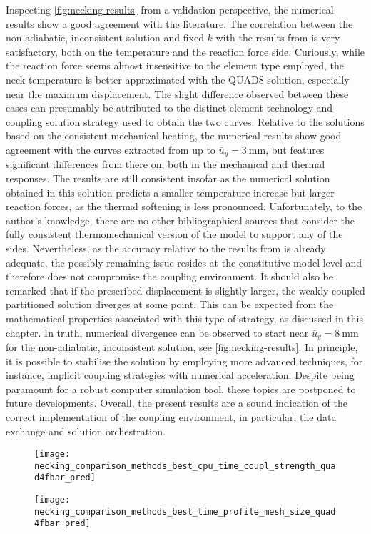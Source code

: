 Inspecting \ref{fig:necking-results} from a validation perspective, the numerical results show a good agreement with the literature.
The correlation between the non-adiabatic, inconsistent solution and fixed $k$ with the results from \cite{simo1992AssociativeCoupledThermoplasticity} is very satisfactory, both on the temperature and the reaction force side.
Curiously, while the reaction force seems almost insensitive to the element type employed, the neck temperature is better approximated with the QUAD8 solution, especially near the maximum displacement.
The slight difference observed between these cases can presumably be attributed to the distinct element technology and coupling solution strategy used to obtain the two curves.
Relative to the solutions based on the consistent mechanical heating, the numerical results show good agreement with the curves extracted from \cite{danowski2014ComputationalModellingThermoStructure} up to $\bar{u}_{y}=\SI{3}{\milli\meter}$, but features significant differences from there on, both in the mechanical and thermal responses.
The results are still consistent insofar as the numerical solution obtained in this solution predicts a smaller temperature increase but larger reaction forces, as the thermal softening is less pronounced.
Unfortunately, to the author's knowledge, there are no other bibliographical sources that consider the fully consistent thermomechanical version of the model to support any of the sides.
Nevertheless, as the accuracy relative to the results from \cite{simo1992AssociativeCoupledThermoplasticity} is already adequate, the possibly remaining issue resides at the constitutive model level and therefore does not compromise the coupling environment.
It should also be remarked that if the prescribed displacement is slightly larger, the weakly coupled partitioned solution diverges at some point.
This can be expected from the mathematical properties associated with this type of strategy, as discussed in this chapter.
In truth, numerical divergence can be observed to start near $\bar{u}_{y}=\SI{8}{\milli\meter}$ for the non-adiabatic, inconsistent solution, see \ref{fig:necking-results}.
In principle, it is possible to stabilise the solution by employing more advanced techniques, for instance, implicit coupling strategies with numerical acceleration.
Despite being paramount for a robust computer simulation tool, these topics are postponed to future developments.
Overall, the present results are a sound indication of the correct implementation of the coupling environment, in particular, the data exchange and solution orchestration.
\begin{figure}
\texttt{[image: necking\_comparison\_methods\_best\_cpu\_time\_coupl\_strength\_quad4fbar\_pred]}
\end{figure}

\begin{figure}
\texttt{[image: necking\_comparison\_methods\_best\_time\_profile\_mesh\_size\_quad4fbar\_pred]}
\end{figure}
